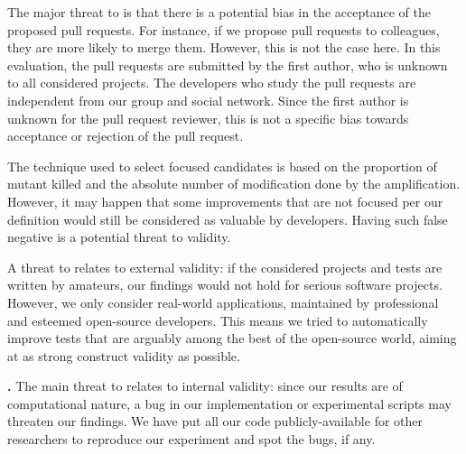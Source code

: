 \textbf{\rqpullrequest{}}
The major threat to \rqpullrequest{} is that there is a potential bias in the acceptance of the proposed pull requests.
For instance, if we propose pull requests to colleagues, they are more likely to merge them.
However, this is not the case here.
In this evaluation, the pull requests are submitted by the first author, who is unknown to all considered projects. 
The developers who study the \dspot pull requests are independent from our group and social network.
Since the first author is unknown for the pull request reviewer, this is not a specific bias towards acceptance or rejection of the pull request.

\textbf{\rqcandidates{}}
The technique used to select focused candidates is based on the proportion of mutant killed and the absolute number of modification done by  the amplification. However, it may happen that some improvements that are not focused per our definition would still be considered as valuable by developers. Having such false negative is a potential threat to validity.

\textbf{\rqeffectiveness{}}
A threat to \rqeffectiveness{} relates to external validity: if the considered projects and tests are written by amateurs, our findings would not hold for serious software projects.
However, we only consider real-world applications, maintained by professional and esteemed open-source developers. This means we tried to automatically improve tests that are arguably among the best of the open-source world, aiming at as strong construct validity as possible.

\textbf{\rqAmplVersusIAmpl{}.}
The main threat to \rqAmplVersusIAmpl{} relates to internal validity: since our results are of computational nature, a bug in our implementation or experimental scripts may threaten our findings. We have put all our code publicly-available for other researchers to reproduce our experiment and spot the bugs, if any.

